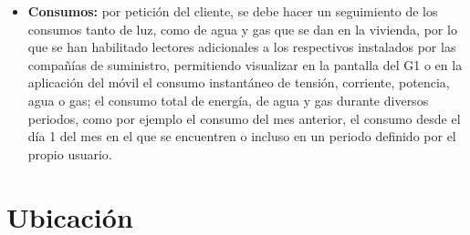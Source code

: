 \begin{itemize}
\item \textbf{Consumos:} por petición del cliente, se debe hacer un seguimiento de los consumos tanto de luz, como de agua y gas que se dan en la vivienda, por lo que se han habilitado lectores adicionales a los respectivos instalados por las compañías de suministro, permitiendo visualizar en la pantalla del G1 o en la aplicación del móvil el consumo instantáneo de tensión, corriente, potencia, agua o gas; el consumo total de energía, de agua y gas durante diversos periodos, como por ejemplo el consumo del mes anterior, el consumo desde el día 1 del mes en el que se encuentren o incluso en un periodo definido por el propio usuario.
\end{itemize} 

\section{Ubicación}


